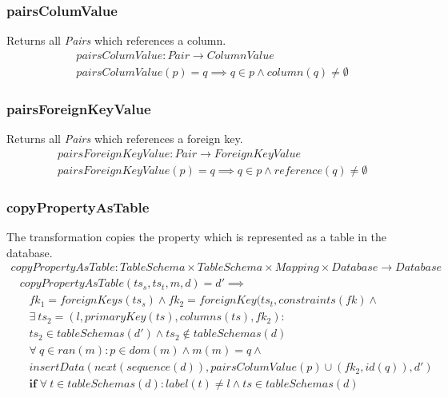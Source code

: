 \documentclass[10pt]{article}
\begin{document}
\subsubsection{pairsColumValue}
Returns all \emph{Pairs} which references a column.
\begin{align}
& pairsColumValue: Pair \rightarrow ColumnValue \\
& pairsColumValue(p) = q \implies q \in p \land column(q) \neq \emptyset  
\end{align}

\subsubsection{pairsForeignKeyValue}
Returns all \emph{Pairs} which references a foreign key.
\begin{align}
& pairsForeignKeyValue : Pair \rightarrow ForeignKeyValue \\
& pairsForeignKeyValue(p) = q \implies q \in p \land reference(q) \neq \emptyset 
\end{align}


\subsubsection{copyPropertyAsTable}
The transformation copies the property which is represented as a table in the database.
\begin{align}
copyPropertyAsTable: TableSchema \times TableSchema \times Mapping \times Database \rightarrow Database
\end{align}
\begin{align}
& copyPropertyAsTable(ts_s, ts_t, m, d) = d' \implies \nonumber  \\
& \;\;\; fk_1 = foreignKeys(ts_s) \land fk_2 = foreignKey(ts_t, constraints(fk) \land \nonumber   \\
& \;\;\;  \exists \:  ts_2 = (l, primaryKey(ts), columns(ts), fk_2) :  \nonumber \\
& \;\;\;  ts_2 \in tableSchemas(d') \land ts_2 \notin tableSchemas(d) \nonumber \\
& \;\;\; \forall \: q \in ran(m) : p \in dom(m) \land m(m) = q \land \nonumber \\  
& \;\;\; insertData(next(sequence(d)), pairsColumValue(p) \cup (fk_2, id(q)) , d')  \nonumber \\
& \;\;\; \mathbf{if} \; \forall \: t \in tableSchemas(d) : label(t) \neq l \land ts \in tableSchemas(d)
\end{align}
\end{document}
